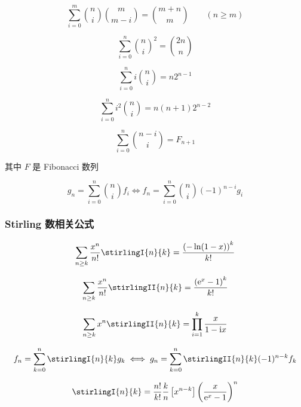 \begin{equation}
    \sum_{i=0}^m \binom{n}{i}\binom{m}{m-i} = \binom{m+n}{m}\qquad(n \geq m)
\end{equation}

\begin{equation}
    \sum_{i=0}^n\binom{n}{i}^2=\binom{2n}{n}
\end{equation}

\begin{equation}
    \sum_{i=0}^ni\binom{n}{i}=n2^{n-1}
\end{equation}

\begin{equation}
    \sum_{i=0}^ni^2\binom{n}{i}=n(n+1)2^{n-2}
\end{equation}

\begin{equation}
    \sum_{i=0}^n\binom{n-i}{i}=F_{n+1}
\end{equation}

其中 \(F\) 是 Fibonacci 数列

\begin{equation}
    g_n = \sum_{i = 0}^{n} \binom{n}{i} f_i \iff f_n = \sum_{i = 0}^{n} \binom{n}{i} (-1)^{n-i} g_i
\end{equation}

\subsubsection{Stirling 数相关公式}

\begin{equation}
    \sum_{n\geq k}\frac{x^n}{n!}\stirlingI{n}{k}=\frac{\left(-\ln(1-x)\right)^k}{k!}
\end{equation}

\begin{equation}
    \sum_{n\geq k}\frac{x^n}{n!}\stirlingII{n}{k}=\frac{\left(\mathrm{e}^x-1\right)^k}{k!}
\end{equation}

\begin{equation}
    \sum_{n\geq k}x^n\stirlingII{n}{k}=\prod_{i=1}^k\frac{x}{1-\mathrm{i}x}
\end{equation}

\begin{equation}
    f_n=\sum_{k=0}^n\stirlingI{n}{k}g_k \iff g_n=\sum_{k=0}^n\stirlingII{n}{k}(-1)^{n-k}f_k
\end{equation}

\begin{equation}
    \stirlingI{n}{k}=\frac{n!}{k!}\frac{k}{n}\left[x^{n-k}\right]\left(\frac{x}{\mathrm{e}^x-1}\right)^n
\end{equation}

